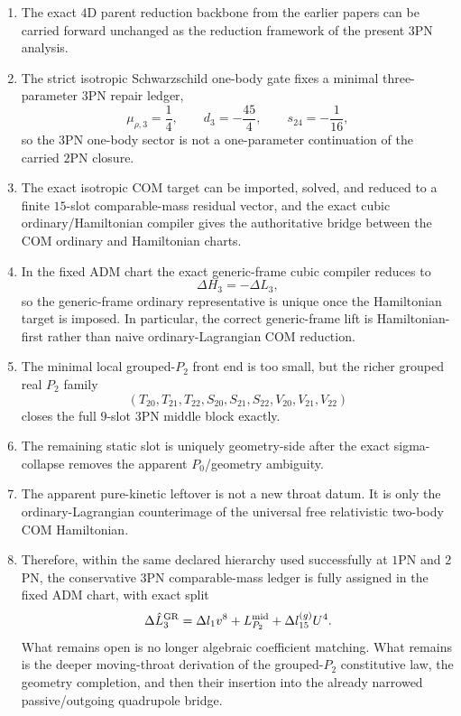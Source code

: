 \documentclass[11pt]{article}
\begin{document}
\begin{enumerate}
  \item The exact $4$D parent reduction backbone from the earlier papers can be
  carried forward unchanged as the reduction framework of the present $3$PN
  analysis.

  \item The strict isotropic Schwarzschild one-body gate fixes a minimal
  three-parameter $3$PN repair ledger,
  \[
  \mu_{\rho,3}=\frac14,
  \qquad
  d_3=-\frac{45}{4},
  \qquad
  s_{24}=-\frac1{16},
  \]
  so the $3$PN one-body sector is not a one-parameter continuation of the
  carried $2$PN closure.

  \item The exact isotropic COM target can be imported, solved, and reduced to a
  finite $15$-slot comparable-mass residual vector, and the exact cubic
  ordinary/Hamiltonian compiler gives the authoritative bridge between the COM
  ordinary and Hamiltonian charts.

  \item In the fixed ADM chart the exact generic-frame cubic compiler reduces to
  \[
  \Delta H_3=-\Delta L_3,
  \]
  so the generic-frame ordinary representative is unique once the Hamiltonian
  target is imposed.  In particular, the correct generic-frame lift is
  Hamiltonian-first rather than naive ordinary-Lagrangian COM reduction.

  \item The minimal local grouped-$P_2$ front end is too small, but the richer
  grouped real $P_2$ family
  \[
  (T_{20},T_{21},T_{22},S_{20},S_{21},S_{22},V_{20},V_{21},V_{22})
  \]
  closes the full $9$-slot $3$PN middle block exactly.

  \item The remaining static slot is uniquely geometry-side after the exact
  sigma-collapse removes the apparent $P_0$/geometry ambiguity.

  \item The apparent pure-kinetic leftover is not a new throat datum.  It is
  only the ordinary-Lagrangian counterimage of the universal free relativistic
  two-body COM Hamiltonian.

  \item Therefore, within the same declared hierarchy used successfully at $1$PN
  and $2$PN, the conservative $3$PN comparable-mass ledger is fully assigned in
  the fixed ADM chart, with exact split
  \[
  \Delta \hat L_3^{\rm GR}
  =
  \Delta l_1 v^8
  +
  L_{P_2}^{\rm mid}
  +
  \Delta l_{15}^{(g)}U^4.
  \]
  What remains open is no longer algebraic coefficient matching.  What remains
  is the deeper moving-throat derivation of the grouped-$P_2$ constitutive law,
  the geometry completion, and then their insertion into the already narrowed
  passive/outgoing quadrupole bridge.
\end{enumerate}
\end{document}
